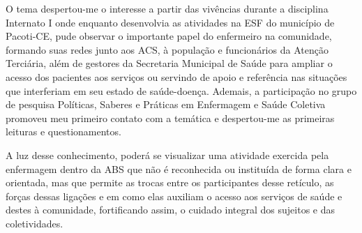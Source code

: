 O tema despertou-me o interesse a partir das vivências durante a disciplina Internato I onde enquanto desenvolvia as atividades na \acrshort{ESF} do município de Pacoti-CE, pude observar o importante papel do enfermeiro na comunidade, formando suas redes junto aos \acrshort{ACS}, à população e funcionários da Atenção Terciária, além de gestores da Secretaria Municipal de Saúde para ampliar o acesso dos pacientes aos serviços ou servindo de apoio e referência nas situações que interferiam em seu estado de saúde-doença. Ademais, a participação no grupo de pesquisa Políticas, Saberes e Práticas em Enfermagem e Saúde Coletiva promoveu meu primeiro contato com a temática e despertou-me as primeiras leituras e questionamentos. 

A luz desse conhecimento, poderá se visualizar uma atividade exercida pela enfermagem dentro da \acrshort{ABS} que não é reconhecida ou instituída de forma clara e orientada, mas que permite as trocas entre os participantes desse retículo, as forças dessas ligações e em como elas auxiliam o acesso aos serviços de saúde e destes à comunidade, fortificando assim, o cuidado integral dos sujeitos e das coletividades.   
